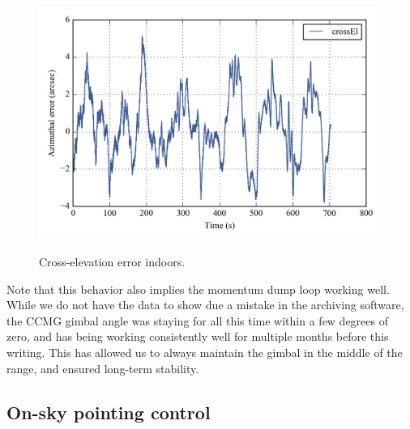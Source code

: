 \begin{figure}[!h]
\begin{center}
\includegraphics{Figures/simplePlot_crossEl.png}
\label{fig:simplePlot_crossEl}
\vspace{-0.5cm}
\caption[Cross-elevation error indoors]{Cross-elevation error indoors.}
\end{center}
\end{figure}

Note that this behavior also implies the momentum dump loop working well. While we do not have the data to show due a mistake in the archiving software, the CCMG gimbal angle was staying for all this time within a few degrees of zero, and has being working consistently well for multiple months before this writing. This has allowed us to always maintain the gimbal in the middle of the range, and ensured long-term stability.

\subsection{On-sky pointing control}


